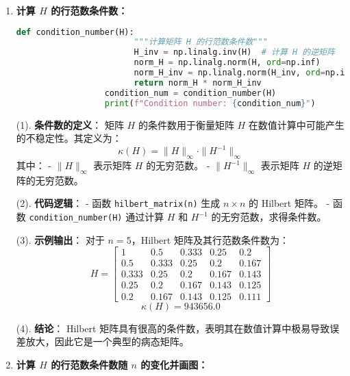 \documentclass{article}
\begin{document}
\begin{enumerate}[itemsep=1em]
      \item \textbf{计算 \( H \) 的行范数条件数：}

            \begin{lstlisting}[language=Python]
                  def condition_number(H):
                        """计算矩阵 H 的行范数条件数"""
                        H_inv = np.linalg.inv(H)  # 计算 H 的逆矩阵
                        norm_H = np.linalg.norm(H, ord=np.inf)
                        norm_H_inv = np.linalg.norm(H_inv, ord=np.inf)
                        return norm_H * norm_H_inv
                  condition_num = condition_number(H)
                  print(f"Condition number: {condition_num}")
    \end{lstlisting}
            (1). \textbf{条件数的定义}：
            矩阵 \( H \) 的条件数用于衡量矩阵 \( H \) 在数值计算中可能产生的不稳定性。其定义为：
            \[
                  \kappa(H) = \|H\|_{\infty} \cdot \|H^{-1}\|_{\infty}
            \]
            其中：
            - \( \|H\|_{\infty} \) 表示矩阵 \( H \) 的无穷范数。
            - \( \|H^{-1}\|_{\infty} \) 表示矩阵 \( H \) 的逆矩阵的无穷范数。

            (2). \textbf{代码逻辑}：
            - 函数 \texttt{hilbert\_matrix(n)} 生成 \( n \times n \) 的 Hilbert 矩阵。
            - 函数 \texttt{condition\_number(H)} 通过计算 \( H \) 和 \( H^{-1} \) 的无穷范数，求得条件数。

            (3). \textbf{示例输出}：
            对于 \( n = 5 \)，Hilbert 矩阵及其行范数条件数为：
            \[
                  H = \begin{bmatrix}
                        1     & 0.5   & 0.333 & 0.25  & 0.2   \\
                        0.5   & 0.333 & 0.25  & 0.2   & 0.167 \\
                        0.333 & 0.25  & 0.2   & 0.167 & 0.143 \\
                        0.25  & 0.2   & 0.167 & 0.143 & 0.125 \\
                        0.2   & 0.167 & 0.143 & 0.125 & 0.111
                  \end{bmatrix}
            \]
            \[
                  \kappa(H) = 943656.0
            \]

            (4). \textbf{结论}：
            Hilbert 矩阵具有很高的条件数，表明其在数值计算中极易导致误差放大，因此它是一个典型的病态矩阵。
      \item \textbf{计算 \( H \) 的行范数条件数随 \( n \) 的变化并画图：}


\end{enumerate}
\end{document}

